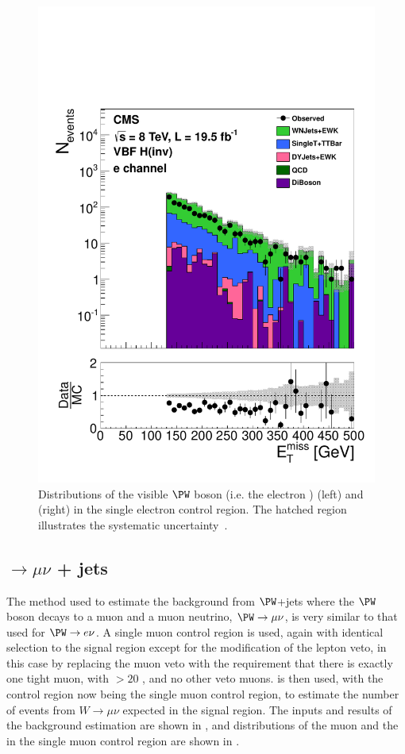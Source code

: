 \begin{figure}
  \includegraphics[width=.6\largefigwidth]{plots/prompt/AN-12-403-figs/hWEl_MET.pdf}
  \caption{Distributions of the visible $\PW$ boson \pt (i.e. the electron \pt) (left) and \MET (right) in the single electron control region. The hatched region illustrates the systematic uncertainty~\cite{ARTICLE:CMSAN-12-403}.}
  \label{fig:promptwenu}
\end{figure}

\subsection{\PW$\rightarrow \mu\nu$ + jets}
\label{sec:promptwmunu}
The method used to estimate the background from $\PW$+jets where the $\PW$ boson decays to a muon and a muon neutrino, $\PW\rightarrow\mu\nu$, is very similar to that used for $\PW\rightarrow e\nu$. A single muon control region is used, again with identical selection to the signal region except for the modification of the lepton veto, in this case by replacing the muon veto with the requirement that there is exactly one tight muon, with \pt$>20$ \GeV, and no other veto muons.  is then used, with the control region now being the single muon control region, to estimate the number of events from $W\rightarrow\mu\nu$ expected in the signal region. The inputs and results of the background estimation are shown in , and distributions of the muon \pt and the \MET in the single muon control region are shown in .

